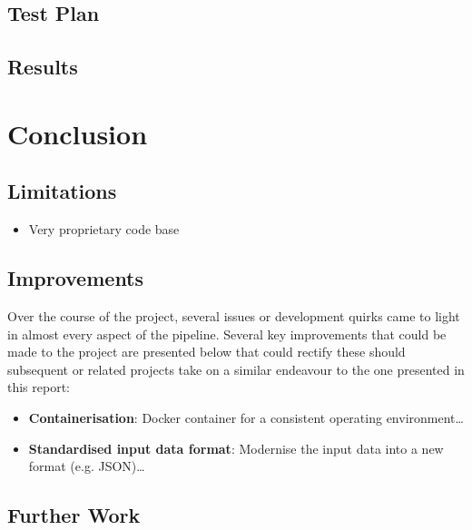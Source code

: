 \documentclass[conference]{IEEEtran}
\begin{document}
\subsection{Test Plan}

\subsection{Results}



\section{Conclusion}
\label{sec:conclusion}

\subsection{Limitations}

\begin{itemize}
    \item Very proprietary code base
\end{itemize}

\subsection{Improvements}

Over the course of the project, several issues or development quirks came to light in almost every aspect of the pipeline. Several key improvements that could be made to the project are presented below that could rectify these should subsequent or related projects take on a similar endeavour to the one presented in this report:

\begin{itemize}
    \item \textbf{Containerisation}: Docker container for a consistent operating environment\dots
    \item \textbf{Standardised input data format}: Modernise the input data into a new format (e.g. JSON)\dots
\end{itemize}

\subsection{Further Work}




\end{document}
